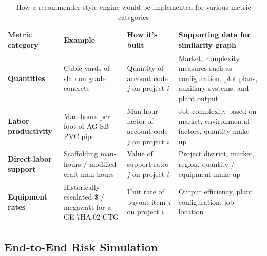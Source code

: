 \documentclass[12pt, a4paper]{article} %
\begin{document}
\begin{table}[h]
\small
\renewcommand{\arraystretch}{1.2}
\setlength{\tabcolsep}{5pt}

\begin{tabularx}{\textwidth}{@{}>{\raggedright\arraybackslash\bfseries}p{3.0cm}%
                                   >{\raggedright\arraybackslash}p{3.0cm}%
                                   >{\raggedright\arraybackslash}p{3.0cm}%
                                   >{\raggedright\arraybackslash}X@{}}
\toprule
Metric category & Example & How it's built & Supporting data for similarity graph \\
\midrule
Quantities & Cubic-yards of slab on grade concrete & Quantity of account code $j$ on project $i$ & Market, complexity measures such as configuration, plot plans, auxiliary systems, and plant output \\[0.8ex]

Labor productivity & Man-hours per foot of AG SB PVC pipe & Man-hour factor of account code $j$ on project $i$ & Job complexity based on market, environmental factors, quantity make-up \\[0.8ex]

Direct-labor support & Scaffolding man-hours / modified craft man-hours & Value of support ratio $j$ on project $i$ & Project district, market, region, quantity / equipment make-up \\ [0.8ex]

Equipment rates & Historically escalated \$ / megawatt for a GE 7HA.02 CTG & Unit rate of buyout item $j$ on project $i$ & Output efficiency, plant configuration, job location \\
\bottomrule
\end{tabularx}

\caption{How a recommender-style engine would be implemented for various metric categories}
\label{tab:metric_overview}
\end{table}

\subsection*{End-to-End Risk Simulation}
\end{document}
